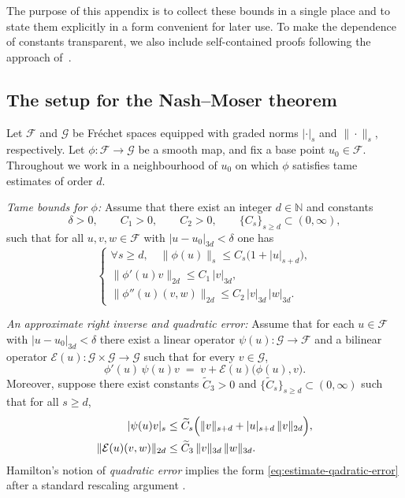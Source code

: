 \documentclass[11pt]{amsart}
\newcommand{\F}{\mathcal{F}}
\newcommand{\G}{\mathcal{G}}
\begin{document}
The purpose of this appendix is to collect these bounds in a single place and to state them
explicitly in a form convenient for later use. To make the
dependence of constants transparent, we also include self-contained proofs following the
approach of~\cite{DonaldsonLehmann2024,Raymond1989}.

\subsection{The setup for the Nash--Moser theorem}
\label{sec:appendix:setup}
Let $\F$ and $\G$ be Fr\'echet spaces equipped with graded norms $|\cdot|_s$ and $\|\cdot\|_s$,
respectively.  Let $\phi\colon \F\to \G$ be a smooth map, and fix a base point
$u_0\in \F$.  Throughout we work in a neighbourhood of $u_0$ on which $\phi$ satisfies
tame estimates of order $d$.

\medskip
\noindent
\textit{Tame bounds for $\phi$:}
Assume that there exist an integer $d\in\mathbb{N}$ and constants
\[
\delta>0,\qquad C_1>0,\qquad C_2>0,\qquad \{C_s\}_{s\ge d}\subset (0,\infty),
\]
such that for all $u,v,w\in \F$ with $|u-u_0|_{3d}<\delta$ one has
\begin{equation}
	\label{eq:tame-estimates}
	\begin{cases}
		\forall s\ge d,\quad \|\phi(u)\|_s \le C_s\bigl(1+|u|_{s+d}\bigr),\\[2mm]
		\|\phi'(u)v\|_{2d}\le C_1\,|v|_{3d},\\[2mm]
		\|\phi''(u)(v,w)\|_{2d}\le C_2\,|v|_{3d}\,|w|_{3d}.
	\end{cases}
\end{equation}

\medskip
\noindent
\textit{An approximate right inverse and quadratic error:}
Assume that for each $u\in \F$ with $|u-u_0|_{3d}<\delta$ there exist a linear operator
$\psi(u)\colon \G\to \F$ and a bilinear operator
$\mathcal{E}(u)\colon \G\times \G\to \G$
such that for every $v\in \G$,
\begin{equation}
	\label{eq:definition-inverse}
	\phi'(u)\,\psi(u)v \;=\; v + \mathcal{E}(u)\bigl(\phi(u),v\bigr).
\end{equation}
Moreover, suppose there exist constants $\widetilde C_3>0$ and
$\{\widetilde C_s\}_{s\ge d}\subset (0,\infty)$ such that for all $s\ge d$,
\begin{align}
	\label{eq:estimate-inverse}
	|\psi(u)v|_s
	&\le \widetilde C_s\Bigl(\|v\|_{s+d} + |u|_{s+d}\,\|v\|_{2d}\Bigr),\\
	\label{eq:estimate-qadratic-error}
	\|\mathcal{E}(u)(v,w)\|_{2d}
	&\le \widetilde C_3\,\|v\|_{3d}\,\|w\|_{3d}.
\end{align}
Hamilton's notion of \emph{quadratic error} implies the form \eqref{eq:estimate-qadratic-error}
after a standard rescaling argument \cite[Theorem~II.2.1]{Hamilton1982}.
\end{document}

